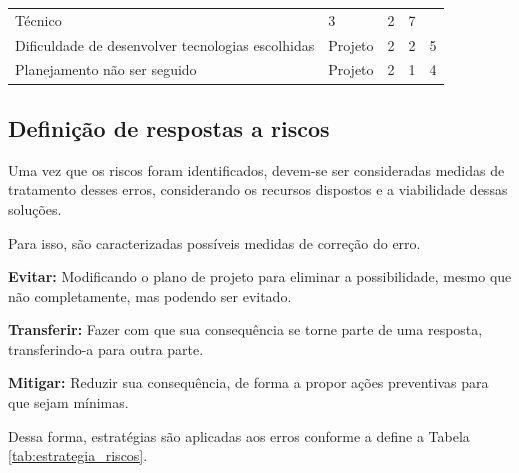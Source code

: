 \begin{table}[h]
{\begin{tabular}{ l l l l l }
    \multicolumn{1}{p{2.550cm}|}{Técnico \centering } &
    \multicolumn{1}{p{1.483cm}|}{3 \centering } &
    \multicolumn{1}{p{2.600cm}|}{2 \centering } &
    \multicolumn{1}{p{1.000cm}|}{7 \centering }
  \\  
  \cline{1-1}\cline{2-2}\cline{3-3}\cline{4-4}\cline{5-5}  
    \multicolumn{1}{|p{3.850cm}|}{Dificuldade de desenvolver tecnologias escolhidas \centering } &
    \multicolumn{1}{p{2.550cm}|}{Projeto \centering } &
    \multicolumn{1}{p{1.483cm}|}{2 \centering } &
    \multicolumn{1}{p{2.600cm}|}{2 \centering } &
    \multicolumn{1}{p{1.000cm}|}{5 \centering }
  \\  
  \cline{1-1}\cline{2-2}\cline{3-3}\cline{4-4}\cline{5-5}  
    \multicolumn{1}{|p{3.850cm}|}{Planejamento não ser seguido \centering } &
    \multicolumn{1}{p{2.550cm}|}{Projeto \centering } &
    \multicolumn{1}{p{1.483cm}|}{2 \centering } &
    \multicolumn{1}{p{2.600cm}|}{1 \centering } &
    \multicolumn{1}{p{1.000cm}|}{4 \centering }
  \\  
  \hline

 \end{tabular} }
\end{table}

\newpage

\subsection{Definição de respostas a riscos}
Uma vez que os riscos foram identificados, devem-se ser consideradas medidas de tratamento desses erros, considerando os recursos dispostos e a viabilidade dessas soluções.
\par Para isso, são caracterizadas possíveis medidas de correção do erro.

\textbf{Evitar:} 
Modificando o plano de projeto para eliminar a possibilidade, mesmo que não completamente, mas podendo ser evitado.

\textbf{Transferir:} 
Fazer com que sua consequência se torne parte de uma resposta, transferindo-a para outra parte.

\textbf{Mitigar:} 
Reduzir sua consequência, de forma a propor ações preventivas para que sejam mínimas.
 
\par Dessa forma, estratégias são aplicadas aos erros conforme a define a Tabela \ref{tab:estrategia_riscos}.

